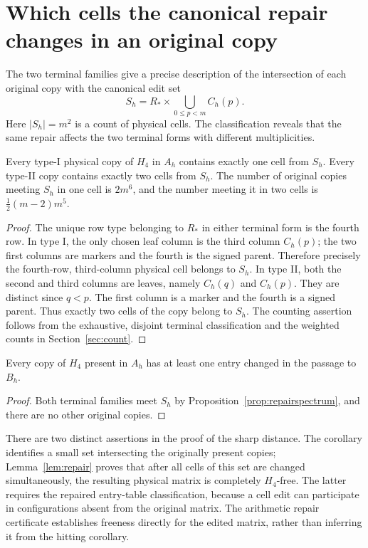 \section{Which cells the canonical repair changes in an original copy}
\label{sec:repairspectrum}
The two terminal families give a precise description of the
intersection of each original copy with the canonical edit set
\[
 S_h=R_*\times\bigcup_{0\le p<m}C_h(p).
\]
Here $|S_h|=m^2$ is a count of physical cells. The classification
reveals that the same repair affects the two terminal forms with
different multiplicities.

\begin{proposition}
\label{prop:repairspectrum}
Every type-I physical copy of $H_4$ in $A_h$ contains exactly one
cell from $S_h$. Every type-II copy contains exactly two cells from
$S_h$. The number of original copies meeting $S_h$ in one cell is
$2m^6$, and the number meeting it in two cells is
$\frac12(m-2)m^5$.
\end{proposition}
\begin{proof}
The unique row type belonging to $R_*$ in either terminal form is
the fourth row. In type I, the only chosen leaf column is the third
column $C_h(p)$; the two first columns are markers and the fourth
is the signed parent. Therefore precisely the fourth-row,
third-column physical cell belongs to $S_h$. In type II, both the
second and third columns are leaves, namely $C_h(q)$ and $C_h(p)$.
They are distinct since $q<p$. The first column is a marker and
the fourth is a signed parent. Thus exactly two cells of the copy
belong to $S_h$. The counting assertion follows from the exhaustive,
disjoint terminal classification and the weighted counts in
Section~\ref{sec:count}.
\end{proof}

\begin{corollary}
Every copy of $H_4$ present in $A_h$ has at least one entry changed
in the passage to $B_h$.
\end{corollary}
\begin{proof}
Both terminal families meet $S_h$ by
Proposition~\ref{prop:repairspectrum}, and there are no other
original copies.
\end{proof}

There are two distinct assertions in the proof of the sharp distance.
The corollary identifies a small set intersecting the originally
present copies; Lemma~\ref{lem:repair} proves that after all cells
of this set are changed simultaneously, the resulting physical
matrix is completely $H_4$-free. The latter requires the repaired
entry-table classification, because a cell edit can participate in
configurations absent from the original matrix. The arithmetic
repair certificate establishes freeness directly for the edited
matrix, rather than inferring it from the hitting corollary.

